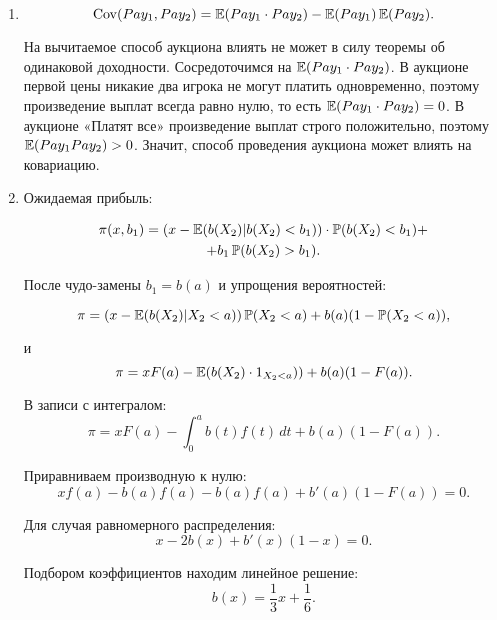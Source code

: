 

\begin{enumerate}
\item

\begin{equation}
\operatorname{Cov}(Pay_{1}, Pay_{2})=\operatorname{\mathbb{E}}(Pay_{1}\cdot Pay_{2})-\operatorname{\mathbb{E}}(Pay_{1})\operatorname{\mathbb{E}}(Pay_{2}).
\end{equation}

На вычитаемое способ аукциона влиять не может в силу теоремы об одинаковой доходности. Сосредоточимся на $\operatorname{\mathbb{E}}(Pay_{1}\cdot Pay_{2})$. В аукционе первой цены никакие два игрока не могут платить одновременно, поэтому произведение выплат всегда равно нулю, то есть $ \operatorname{\mathbb{E}}(Pay_{1}\cdot Pay_{2})=0 $. В аукционе «Платят все» произведение выплат строго положительно, поэтому $ \operatorname{\mathbb{E}}(Pay_{1}Pay_{2})>0 $. Значит, способ проведения аукциона может влиять на ковариацию.



\item  Ожидаемая прибыль:

\begin{multline}
\pi(x,b_{1})=(x-\operatorname{\mathbb{E}}(b(X_{2})|b(X_{2})<b_{1}))\cdot \operatorname{\mathbb{P}}(b(X_{2})<b_{1})+\\
+b_{1}\operatorname{\mathbb{P}}(b(X_{2})>b_{1}).
\end{multline}

После чудо-замены $ b_{1}=b(a) $ и упрощения вероятностей:

\begin{equation}
\pi=(x-\operatorname{\mathbb{E}}(b(X_{2})|X_{2}<a))\operatorname{\mathbb{P}}(X_{2}<a)+b(a)(1-\operatorname{\mathbb{P}}(X_{2}<a)),
\end{equation}

и
\begin{equation}
\pi=xF(a)-\operatorname{\mathbb{E}}(b(X_{2})\cdot 1_{X_{2}<a}))+b(a)(1-F(a)).
\end{equation}

В записи с интегралом:
\begin{equation}
\pi=xF(a)-\int_{0}^{a}b(t)f(t) \, dt+b(a)(1-F(a)).
\end{equation}

Приравниваем производную к нулю:
\begin{equation}
xf(a)-b(a)f(a)-b(a)f(a)+b'(a)(1-F(a))=0.
\end{equation}

Для случая равномерного распределения:
\begin{equation}
x-2b(x)+b'(x)(1-x)=0.
\end{equation}

Подбором коэффициентов находим линейное решение:
\begin{equation}
b(x)=\frac{1}{3}x+\frac{1}{6}.
\end{equation}



\end{enumerate}

